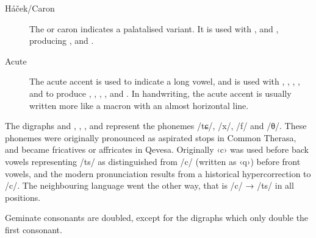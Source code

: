 \documentclass[grammar]{subfiles}
\begin{document}
\begin{description}
  \item[Háček/Caron] The  or caron indicates a palatalised
    variant.  It is used with ,  and , producing , 
    and .
  \item[Acute] The acute accent is used to indicate a long vowel, and is used
    with , , , ,  and  to produce , , ,
    ,  and .  In handwriting, the acute accent is usually written more
    like a macron with an almost horizontal line. 
\end{description}

The digraphs  and , , , and  represent the
phonemes /tɕ/, /x/, /f/ and /θ/.  These phonemes were originally pronounced as
aspirated stops in Common Therasa, and became fricatives or affricates in
Qevesa.  Originally ‹c› was used before back vowels representing /ts/ as
distinguished from /c/ (written as ‹q›) before front vowels, and the modern
pronunciation results from a historical hypercorrection to /c/.  The
neighbouring language  went the other way, that is /c/ → /ts/ in all
positions.

Geminate consonants are doubled, except for the digraphs which only double the
first consonant.  
\end{document}
